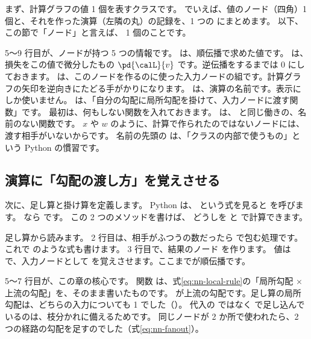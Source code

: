 まず、計算グラフの値 1 個を表すクラスです。
でいえば、値のノード（四角）1 個と、それを作った演算（左隣の丸）の記録を、1 つの  にまとめます。
以下、この節で「ノード」と言えば、 1 個のことです。


5〜9 行目が、ノードが持つ 5 つの情報です。
 は、順伝播で求めた値です。
 は、損失をこの値で微分したもの $\pd{\calL}{v}$ です。逆伝播をするまでは 0 にしておきます。
 は、このノードを作るのに使った入力ノードの組です。計算グラフの矢印を逆向きにたどる手がかりになります。
 は、演算の名前です。表示にしか使いません。
 は、「自分の勾配に局所勾配を掛けて、入力ノードに渡す関数」です。
最初は、何もしない関数を入れておきます。 は、 と同じ働きの、名前のない関数です。
$x$ や $w$ のように、計算で作られたのではないノードには、渡す相手がいないからです。
名前の先頭の \code{_} は、「クラスの内部で使うもの」という Python の慣習です。

\subsection*{演算に「勾配の渡し方」を覚えさせる}

次に、足し算と掛け算を定義します。
Python は、 という式を見ると  を呼びます。 なら  です。
この 2 つのメソッドを書けば、 どうしを \code{+} と \code{*} で計算できます。

\par\ifdim\dimexpr\pagegoal-\pagetotal\relax<6\baselineskip\newpage\fi
{}

足し算から読みます。
2 行目は、相手がふつうの数だったら  で包む処理です。これで  のような式も書けます。
3 行目で、結果のノード  を作ります。
値は  で、入力ノードとして  を覚えさせます。ここまでが順伝播です。

5〜7 行目が、この章の核心です。
関数  は、式\eqref{eq:nn-local-rule}の「局所勾配 $\times$ 上流の勾配」を、そのまま書いたものです。
 が上流の勾配です。足し算の局所勾配は、どちらの入力についても 1 でした（）。
代入の \code{=} ではなく \code{+=} で足し込んでいるのは、枝分かれに備えるためです。
同じノードが 2 か所で使われたら、2 つの経路の勾配を足すのでした（式\eqref{eq:nn-fanout}）。

